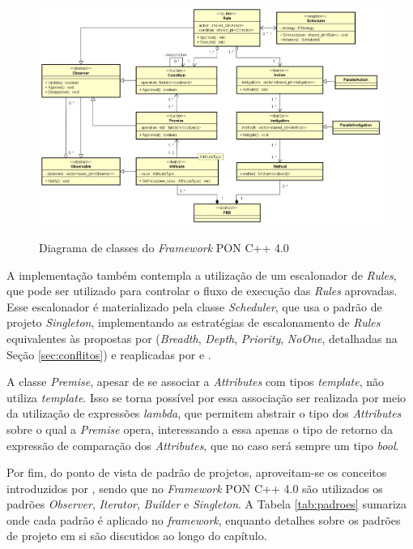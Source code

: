 \begin{figure}[!htb]
    \centering
    \caption{Diagrama de classes do \textit{Framework} PON C++ 4.0}
    \includegraphics[width=\textwidth]{../figures/astah_nop4.png}
    \smallskip
    \label{fig:class_fw4}
\end{figure}

\FloatBarrier

A implementação também contempla a utilização de um escalonador de
\textit{Rules}, que pode ser utilizado para controlar o fluxo de execução das
\textit{Rules} aprovadas. Esse escalonador é materializado pela classe
\textit{Scheduler}, que usa o padrão de projeto \textit{Singleton},
implementando as estratégias de escalonamento de \textit{Rules} equivalentes às
propostas por  (\textit{Breadth},
\textit{Depth}, \textit{Priority}, \textit{NoOne}, detalhadas na Seção
\ref{sec:conflitos}) e reaplicadas por  e
.

A classe \textit{Premise}, apesar de se associar a \textit{Attributes} com tipos
\textit{template}, não utiliza \textit{template}. Isso se torna possível por
essa associação ser realizada por meio da utilização de expressões
\textit{lambda}, que permitem abstrair o tipo dos \textit{Attributes} sobre o
qual a \textit{Premise} opera, interessando a essa apenas o tipo de retorno da
expressão de comparação dos \textit{Attributes}, que no caso será sempre um tipo
\textit{bool}.

Por fim, do ponto de vista de padrão de projetos, aproveitam-se os conceitos
introduzidos por , sendo que no \textit{Framework}
PON C++ 4.0 são utilizados os padrões \textit{Observer}, \textit{Iterator},
\textit{Builder} e \textit{Singleton}. A Tabela \ref{tab:padroes} sumariza onde
cada padrão é aplicado no \textit{framework}, enquanto detalhes sobre os padrões
de projeto em si são discutidos ao longo do capítulo.

